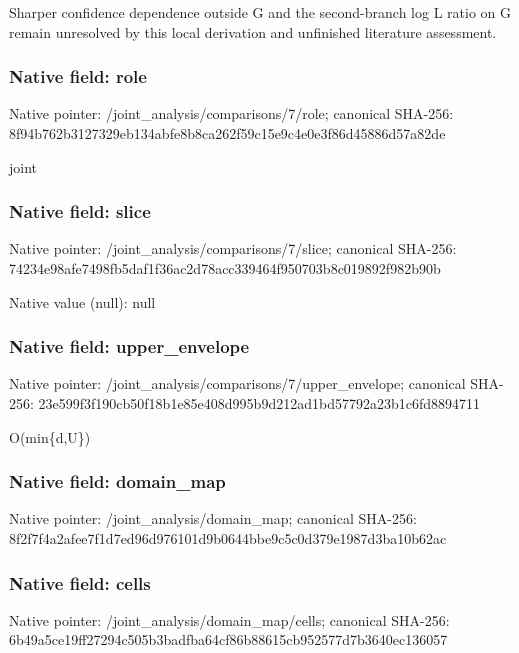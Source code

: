 \documentclass[10pt,a4paper]{article}
\begin{document}
\begingroup\raggedright\sloppy Sharper confidence dependence outside G and the second-branch log L ratio on G remain unresolved by this local derivation and unfinished literature assessment.\par\endgroup

\subsubsection{Native field: role}
Native pointer: /joint\_\allowbreak{}analysis/comparisons/7/role; canonical SHA-256: 8f94b762b3127329eb134abfe8b8ca262f59c15e9c4e0e3f86d45886d57a82de

\begingroup\raggedright\sloppy joint\par\endgroup

\subsubsection{Native field: slice}
Native pointer: /joint\_\allowbreak{}analysis/comparisons/7/slice; canonical SHA-256: 74234e98afe7498fb5daf1f36ac2d78acc339464f950703b8c019892f982b90b

Native value (null): null

\subsubsection{Native field: upper\_\allowbreak{}envelope}
Native pointer: /joint\_\allowbreak{}analysis/comparisons/7/upper\_\allowbreak{}envelope; canonical SHA-256: 23e599f3f190cb50f18b1e85e408d995b9d212ad1bd57792a23b1c6fd8894711

\begingroup\raggedright\sloppy O(min\{d,\allowbreak{}U\})\par\endgroup

\subsubsection{Native field: domain\_\allowbreak{}map}
Native pointer: /joint\_\allowbreak{}analysis/domain\_\allowbreak{}map; canonical SHA-256: 8f2f7f4a2afee7f1d7ed96d976101d9b0644bbe9c5c0d379e1987d3ba10b62ac

\subsubsection{Native field: cells}
Native pointer: /joint\_\allowbreak{}analysis/domain\_\allowbreak{}map/cells; canonical SHA-256: 6b49a5ce19ff27294c505b3badfba64cf86b88615cb952577d7b3640ec136057
\end{document}
